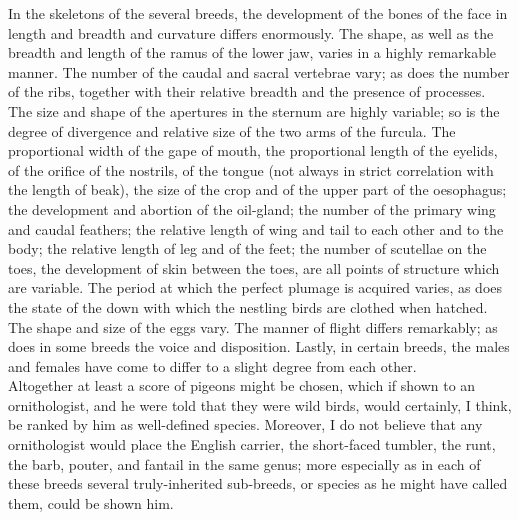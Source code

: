 \indent In the skeletons of the several breeds, the development of the bones of the face in length and breadth and curvature differs enormously. The shape, as well as the breadth and length of the ramus of the lower jaw, varies in a highly remarkable manner. The number of the caudal and sacral vertebrae vary; as does the number of the ribs, together with their relative breadth and the presence of processes. The size and shape of the apertures in the sternum are highly variable; so is the degree of divergence and relative size of the two arms of the furcula. The proportional width of the gape of mouth, the proportional length of the eyelids, of the orifice of the nostrils, of the tongue (not always in strict correlation with the length of beak), the size of the crop and of the upper part of the oesophagus; the development and abortion of the oil-gland; the number of the primary wing and caudal feathers; the relative length of wing and tail to each other and to the body; the relative length of leg and of the feet; the number of scutellae on the toes, the development of skin between the toes, are all points of structure which are variable. The period at which the perfect plumage is acquired varies, as does the state of the down with which the nestling birds are clothed when hatched. The shape and size of the eggs vary. The manner of flight differs remarkably; as does in some breeds the voice and disposition. Lastly, in certain breeds, the males and females have come to differ to a slight degree from each other.  \\
\indent Altogether at least a score of pigeons might be chosen, which if shown to an ornithologist, and he were told that they were wild birds, would certainly, I think, be ranked by him as well-defined species. Moreover, I do not believe that any ornithologist would place the English carrier, the short-faced tumbler, the runt, the barb, pouter, and fantail in the same genus; more especially as in each of these breeds several truly-inherited sub-breeds, or species as he might have called them, could be shown him.  \\
